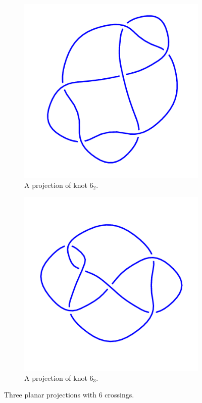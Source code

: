 \documentclass[12pt,letterpaper]{article}
\theoremstyle{definition}
\begin{document}
\begin{figure}[h]
\begin{subfigure}{.3\textwidth}
        \includegraphics[width=\textwidth]{rgp08pics/6_2.png}
        \caption{A projection of knot $6_2$.}
    \end{subfigure}
    \quad
    \begin{subfigure}{.3\textwidth}
        \centering
        \includegraphics[width=\textwidth]{rgp08pics/6_3.png}
        \caption{A projection of knot $6_3$.}
    \end{subfigure}
\caption{Three planar projections with 6 crossings.}
\end{figure}
\end{document}
